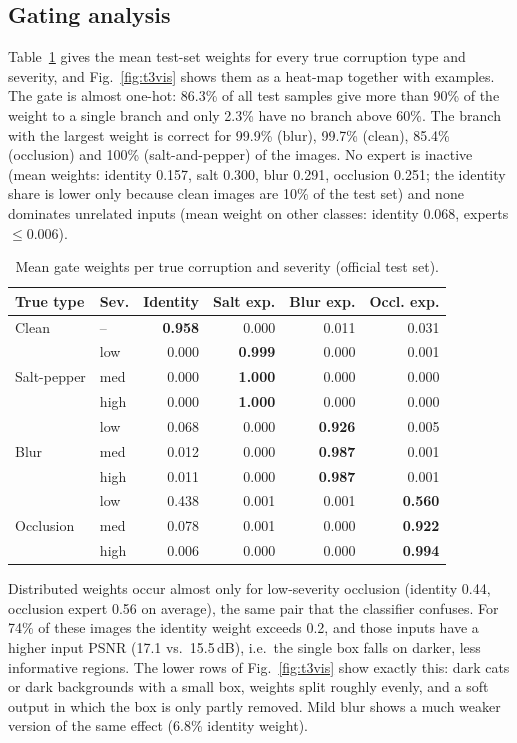 \documentclass[conference]{IEEEtran}
\begin{document}
\subsection{Gating analysis}\label{sec:gate}
Table~\ref{tab:gate} gives the mean test-set weights for every true corruption type and severity, and Fig.~\ref{fig:t3vis} shows them as a heat-map together with examples. The gate is almost one-hot: 86.3\% of all test samples give more than 90\% of the weight to a single branch and only 2.3\% have no branch above 60\%. The branch with the largest weight is correct for 99.9\% (blur), 99.7\% (clean), 85.4\% (occlusion) and 100\% (salt-and-pepper) of the images. No expert is inactive (mean weights: identity 0.157, salt 0.300, blur 0.291, occlusion 0.251; the identity share is lower only because clean images are 10\% of the test set) and none dominates unrelated inputs (mean weight on other classes: identity 0.068, experts $\le$0.006).

\begin{table}[t]
\caption{Mean gate weights per true corruption and severity (official test set).}
\label{tab:gate}
\centering\footnotesize
\begin{tabular}{@{}llrrrr@{}}
\toprule
True type & Sev. & Identity & Salt exp. & Blur exp. & Occl. exp.\\
\midrule
Clean & -- & \textbf{0.958} & 0.000 & 0.011 & 0.031\\
\midrule
\multirow{3}{*}{Salt-pepper} & low & 0.000 & \textbf{0.999} & 0.000 & 0.001\\
 & med & 0.000 & \textbf{1.000} & 0.000 & 0.000\\
 & high & 0.000 & \textbf{1.000} & 0.000 & 0.000\\
\midrule
\multirow{3}{*}{Blur} & low & 0.068 & 0.000 & \textbf{0.926} & 0.005\\
 & med & 0.012 & 0.000 & \textbf{0.987} & 0.001\\
 & high & 0.011 & 0.000 & \textbf{0.987} & 0.001\\
\midrule
\multirow{3}{*}{Occlusion} & low & 0.438 & 0.001 & 0.001 & \textbf{0.560}\\
 & med & 0.078 & 0.001 & 0.000 & \textbf{0.922}\\
 & high & 0.006 & 0.000 & 0.000 & \textbf{0.994}\\
\bottomrule
\end{tabular}
\end{table}

Distributed weights occur almost only for low-severity occlusion (identity 0.44, occlusion expert 0.56 on average), the same pair that the classifier confuses. For 74\% of these images the identity weight exceeds 0.2, and those inputs have a higher input PSNR (17.1 vs.\ 15.5\,dB), i.e.\ the single box falls on darker, less informative regions. The lower rows of Fig.~\ref{fig:t3vis} show exactly this: dark cats or dark backgrounds with a small box, weights split roughly evenly, and a soft output in which the box is only partly removed. Mild blur shows a much weaker version of the same effect (6.8\% identity weight).
\end{document}
